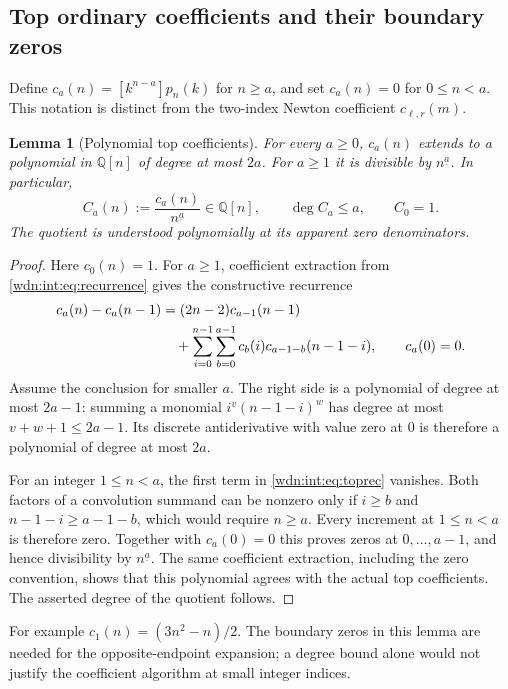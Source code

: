 \documentclass[11pt,letterpaper]{article}
\newtheorem{lemma}[theorem]{Lemma}
\theoremstyle{remark}\newtheorem{remark}[theorem]{Remark}
\newcommand{\fall}[2]{#1^{\underline{#2}}}
\newcommand{\Q}{\mathbb Q}
\begin{document}
\subsection{Top ordinary coefficients and their boundary zeros}
Define $c_a(n)=[k^{n-a}]p_n(k)$ for $n\ge a$, and set $c_a(n)=0$
for $0\le n<a$. This notation is distinct from the two-index Newton
coefficient $c_{\ell,r}(m)$.
\begin{lemma}[Polynomial top coefficients]\label{wdn:int:lem:top}
For every $a\ge0$, $c_a(n)$ extends to a polynomial in $\Q[n]$ of degree
at most $2a$. For $a\ge1$ it is divisible by $\fall n a$. In particular,
\begin{equation}\label{wdn:int:eq:Ca}
 C_a(n):=\frac{c_a(n)}{\fall n a}\in\Q[n],\qquad
 \deg C_a\le a,\qquad C_0=1.
\end{equation}
The quotient is understood polynomially at its apparent zero denominators.
\end{lemma}
\begin{proof}
Here $c_0(n)=1$. For $a\ge1$, coefficient extraction from
\eqref{wdn:int:eq:recurrence} gives the constructive recurrence
\begin{align}
 c_a(n)-c_a(n-1)
 &=(2n-2)c_{a-1}(n-1)\notag\\
 &\quad+\sum_{i=0}^{n-1}\sum_{b=0}^{a-1}
                   c_b(i)c_{a-1-b}(n-1-i),\qquad c_a(0)=0.
 \label{wdn:int:eq:toprec}
\end{align}
Assume the conclusion for smaller $a$. The right side is a polynomial
of degree at most $2a-1$: summing a monomial
$i^v(n-1-i)^w$ has degree at most $v+w+1\le2a-1$.
Its discrete antiderivative with value zero at $0$ is therefore a polynomial
of degree at most $2a$.

For an integer $1\le n<a$, the first term in \eqref{wdn:int:eq:toprec} vanishes.
Both factors of a convolution summand can be nonzero only if
$i\ge b$ and $n-1-i\ge a-1-b$, which would require $n\ge a$.
Every increment at $1\le n<a$ is therefore zero. Together with $c_a(0)=0$
this proves zeros at $0,\ldots,a-1$, and hence divisibility by
$\fall n a$. The same coefficient extraction, including the zero
convention, shows that this polynomial agrees with the actual top
coefficients. The asserted degree of the quotient follows.
\end{proof}
For example $c_1(n)=(3n^2-n)/2$. The boundary zeros in this lemma are
needed for the opposite-endpoint expansion; a degree bound alone would
not justify the coefficient algorithm at small integer indices.
\end{document}
